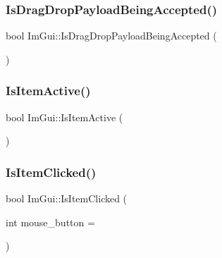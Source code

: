 \hypertarget{namespace_im_gui_a673042a1ed3eeb3c19781faed83ad4a8}{}\label{namespace_im_gui_a673042a1ed3eeb3c19781faed83ad4a8} 
\subsubsection{\texorpdfstring{Is\+Drag\+Drop\+Payload\+Being\+Accepted()}{IsDragDropPayloadBeingAccepted()}}
{\footnotesize\ttfamily bool Im\+Gui\+::\+Is\+Drag\+Drop\+Payload\+Being\+Accepted (\begin{DoxyParamCaption}{ }\end{DoxyParamCaption})}

\hypertarget{namespace_im_gui_a2d8ac4569456a8003e4dddd39caf771c}{}\label{namespace_im_gui_a2d8ac4569456a8003e4dddd39caf771c} 
\subsubsection{\texorpdfstring{Is\+Item\+Active()}{IsItemActive()}}
{\footnotesize\ttfamily bool Im\+Gui\+::\+Is\+Item\+Active (\begin{DoxyParamCaption}{ }\end{DoxyParamCaption})}

\hypertarget{namespace_im_gui_a0b5780dbd580e28f5d31f39da80b0b01}{}\label{namespace_im_gui_a0b5780dbd580e28f5d31f39da80b0b01} 
\subsubsection{\texorpdfstring{Is\+Item\+Clicked()}{IsItemClicked()}}
{\footnotesize\ttfamily bool Im\+Gui\+::\+Is\+Item\+Clicked (\begin{DoxyParamCaption}\item[{int}]{mouse\+\_\+button = {} }\end{DoxyParamCaption})}

\hypertarget{namespace_im_gui_ac9a400eff3a9561d95e80486c52a660b}{}\label{namespace_im_gui_ac9a400eff3a9561d95e80486c52a660b} 
